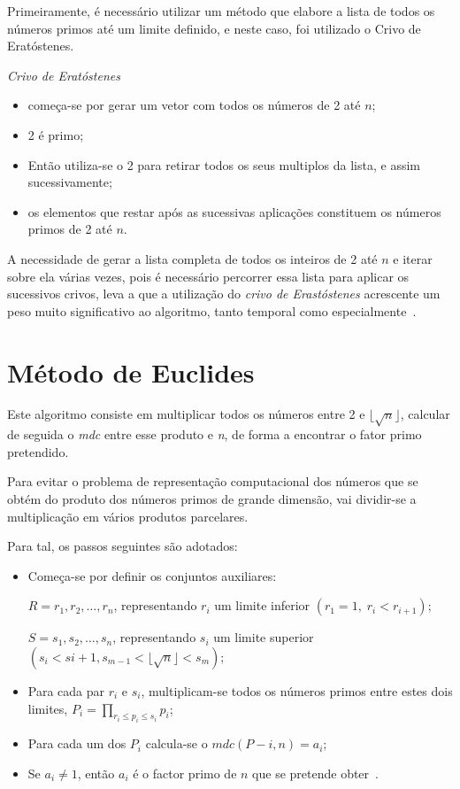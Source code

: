 Primeiramente, é necessário utilizar um método que elabore a lista de todos os números primos até um limite definido, e neste caso, foi utilizado o Crivo de Eratóstenes.

\emph{Crivo de Eratóstenes}
\begin{itemize}
    \item[] começa-se por gerar um vetor com todos os números de 2 até $n$;
    \item[]2 é primo;
    \item[]Então utiliza-se o 2 para retirar todos os seus multiplos da lista, e assim sucessivamente;
    \item[]os elementos que restar após as sucessivas aplicações constituem os números primos de 2 até $n$.
\end{itemize}
A necessidade de gerar a lista completa de todos os inteiros de 2 até $n$ e iterar sobre ela várias vezes, pois é necessário percorrer essa lista para aplicar os sucessivos crivos, leva a que a utilização do \emph{crivo de Erastóstenes} acrescente um peso muito significativo ao algoritmo, tanto temporal como especialmente~\cite{Quaresma2009a}.

\section{Método de Euclides}
\label{sec:MetodoEuclides}

Este algoritmo consiste em multiplicar todos os números entre 2 e $\lfloor \sqrt{n} \rfloor$, calcular de seguida o \emph{mdc} entre esse produto e \emph{n}, de forma a encontrar o fator primo pretendido.

Para evitar o problema de representação computacional dos números que se obtém do produto dos números primos de grande dimensão, vai dividir-se a multiplicação em vários produtos parcelares.

Para tal, os passos seguintes são adotados:

\begin{itemize}
    \item Começa-se por definir os conjuntos auxiliares:

    $R={r_1,r_2,\dots,r_n}$, representando $r_i$ um limite inferior $(r_1=1,\;r_i<r_{i+1});$
    
    $S={s_1,s_2,\dots,s_n}$, representando $s_i$ um limite superior$(s_i<s{i+1},s_{m-1}<\lfloor \sqrt{n} \rfloor<s_m)$;
    \item Para cada par $r_i$ e $s_i$, multiplicam-se todos os números primos entre estes dois limites, $P_i=\prod_{r_i\leq p_i \leq s_i}p_i$;
    \item Para cada um dos $P_i$ calcula-se o $mdc(P-i,n)=a_i$;
    \item Se $a_i \neq 1 $, então $a_i$ é o factor primo de $n$ que se pretende obter~\cite{Quaresma2009a}.
\end{itemize}

